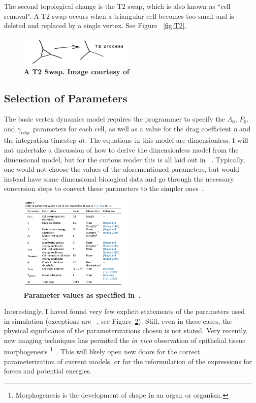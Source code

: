 The second topological change is the T2 swap, which is also known as ``cell removal''. A T2 swap occurs when a triangular cell becomes too small and is deleted and replaced by a single vertex. See Figure ~\ref{fig:T2}.

\begin{figure}
\centering
\includegraphics[width=0.5\textwidth]{../diagrams/t2.png}
\caption[A T2 Swap]{\textbf{A T2 Swap. Image courtesy of}~\cite{Soap}}
\label{fig:t2}
\end{figure}

\subsection{Selection of Parameters}
The basic vertex dynamics model requires the programmer to specify the $A_0$, $P_0$, and $\gamma_{edge}$ parameters for each cell, as well as a value for the drag coefficient $\eta$ and the integration timestep $dt$. The equations in this model are dimensionless. I will not undertake a discussion of how to derive the dimensionless model from the dimensional model, but for the curious reader this is all laid out in ~\cite{HondaNagai}. Typically, one would not choose the values of the aforementioned parameters, but would instead have some dimensional biological data and go through the necessary conversion steps to convert these parameters to the simpler ones~\cite{NewOkuda}.

\begin{figure}
\centering
\includegraphics[width=0.5\textwidth]{../diagrams/params1.png}
\caption{\textbf{Parameter values as specified in~\cite{ChasteMain}.}}
\label{fig:param}
\end{figure}


Interestingly, I haved found very few explicit statements of the parameters used in simulation (exceptions are ~\cite{WoundHealing, ChasteMain, NewOkuda}, see Figure~\ref{fig:param}). Still, even in these cases, the physical significance of the parameterizations chosen is not stated. Very recently, new imaging techniques has permited the \emph{in vivo} observation of epithelial tissue morphogenesis \footnote{Morphogenesis is the development of shape in an organ or organism.}~\cite{Sokolow, Xiong}. This will likely open new doors for the correct parameterization of current models, or for the reformulation of the expressions for forces and potential energies. 

